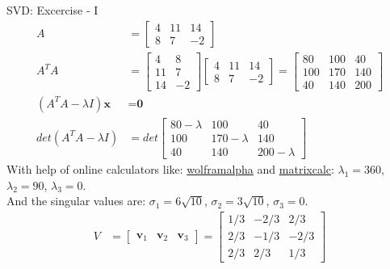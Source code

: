 \documentclass{beamer}
\begin{document}
\begin{frame}{SVD: Excercise - I}
  {\tiny
    \begin{align*}
      A &=
      \begin{bmatrix} 
        4 & 11 & 14 \\
        8 & 7  & -2
      \end{bmatrix} \\
      A^TA &= 
      \begin{bmatrix} 
        4  & 8 \\
        11 & 7 \\
        14 & -2
      \end{bmatrix}
      \begin{bmatrix} 
        4 & 11 & 14 \\
        8 & 7  & -2
      \end{bmatrix}
      = 
      \begin{bmatrix} 
        80  &  100 & 40 \\
        100 & 170  & 140 \\
        40  & 140  & 200
      \end{bmatrix} \\
      (A^TA -{\lambda}I)\textbf{x} &= \textbf{0} \\
      det(A^TA -{\lambda}I) &= 
      det\begin{bmatrix} 
          80-\lambda & 100           & 40            \\
          100        & 170 - \lambda & 140           \\
          40         & 140           & 200 - \lambda 
         \end{bmatrix}
    \end{align*}
    With help of online calculators like: \href{https://www.wolframalpha.com/input/}{wolframalpha} and \href{https://matrixcalc.org/en/vectors.html}{matrixcalc}:
    $\lambda_1 = 360$, $\lambda_2 = 90$, $\lambda_3 = 0$.\\
    And the singular values are: $\sigma_1 = 6\sqrt{10}$, $\sigma_2 = 3\sqrt{10}$, $\sigma_3 = 0$.
    \begin{align*}
      V &= \begin{bmatrix} \textbf{v}_1 &  \textbf{v}_2 & \textbf{v}_3 \end{bmatrix} 
         = \begin{bmatrix}
             1/3 & -2/3 & 2/3 \\
             2/3 & -1/3 & -2/3 \\
             2/3 & 2/3  & 1/3
           \end{bmatrix} \\

\end{align*}}
\end{frame}
\end{document}
